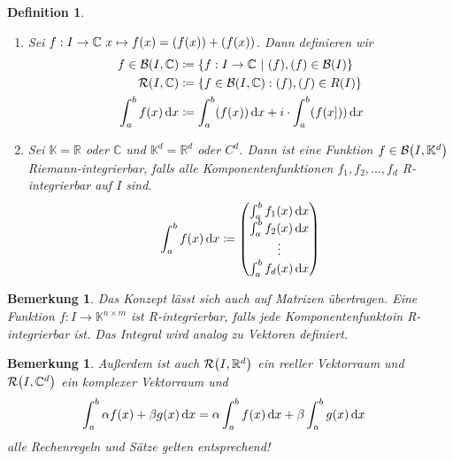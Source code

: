 \documentclass[11pt, twoside, a4paper]{article}
\theoremstyle{plain}
\newtheorem{bemerkung}[blockelement]{Bemerkung}
\newtheorem{definition}[blockelement]{Definition}
\numberwithin{equation}{subsection}
\newcommand{\set}[1]{\left\{#1\right\}}
\newcommand{\of}[1]{\mathopen{}\mathclose{}\bgroup\left(#1\aftergroup\egroup\right)}
\newcommand{\fromto}{\rightarrow{}}
\newcommand{\dif}{\mathop{}\!\mathrm{d}}
\newcommand{\theoremescape}{\leavevmode}
\let\Re\relax
\let\Im\relax
\DeclareMathOperator{\Re}{Re}
\DeclareMathOperator{\Im}{Im}
\newcommand{\R}{\mathbb{R}}
\newcommand{\C}{\mathbb{C}}
\newcommand{\K}{\mathbb{K}}
\newcommand{\mR}{\mathcal{R}}
\newcommand{\mB}{\mathcal{B}}
\begin{document}
    \noindent
    \begin{definition}
        \begin{enumerate}[label=(\alph*)]
            \theoremescape
            \item Sei $f: I\fromto\C~x\mapsto f\of{x} = \Re\of{f\of{x}} + \Im\of{f\of{x}}$. Dann definieren wir
            \begin{align*}
                f\in\mB\of{I, \C} &\coloneqq\set{f: I\fromto\C~\middle|~\Re\of{f}, \Im\of{f} \in \mB\of{I}}\\
                \mR\of{I, \C} &\coloneqq\set{f\in\mB\of{I, \C}: \Re\of{f}, \Im\of{f}\in R\of{I}}\\
                \int_{a}^{b} f\of{x} \dif x &\coloneqq \int_{a}^{b} \Re\of{f\of{x}} \dif x + i\cdot \int_{a}^{b} \Im\of{f\of{x]}} \dif x
            \end{align*}
            \item Sei $\K= \R$ oder $\C$ und $\K^d = \R^d$ oder $C^d$. Dann ist eine Funktion $f\in\mB\of{I, \K^d}$ Riemann-integrierbar, falls alle Komponentenfunktionen $f_1, f_2, \dots, f_d$ R-integrierbar auf $I$ sind.
            \begin{align*}
                \int_{a}^{b} f\of{x} \dif x\coloneqq \begin{pmatrix}
                                                         \int_{a}^{b} f_1\of{x} \dif x \\
                                                         \int_{a}^{b} f_2\of{x} \dif x \\
                                                         \vdots                        \\
                                                         \int_{a}^{b} f_d\of{x} \dif x \\
                \end{pmatrix}
            \end{align*}
        \end{enumerate}
    \end{definition}

    \begin{bemerkung}
        Das Konzept lässt sich auch auf Matrizen übertragen. Eine Funktion $f: I\fromto \K^{n\times m}$ ist R-integrierbar, falls jede Komponentenfunktoin R-integrierbar ist. Das Integral wird analog zu Vektoren definiert.
    \end{bemerkung}
    
    \begin{bemerkung}
        Außerdem ist auch $\mR\of{I, \R^d}$ ein reeller Vektorraum und $\mR\of{I, \C^d}$ ein komplexer Vektorraum und
        \begin{align*}
            \int_{a}^{b} \alpha f\of{x} + \beta g\of{x} \dif x &= \alpha \int_{a}^{b} f\of{x} \dif x + \beta \int_{a}^{b} g\of{x} \dif x
        \end{align*}
        alle Rechenregeln und Sätze gelten entsprechend!
    \end{bemerkung}
\end{document}
